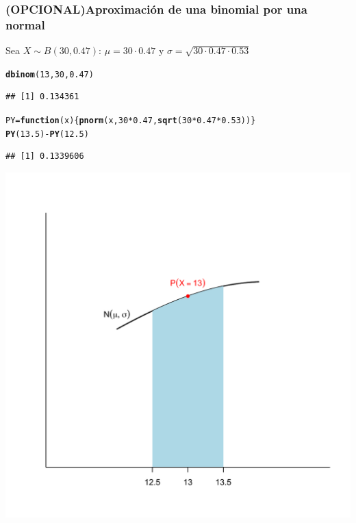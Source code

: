 \documentclass[handout]{beamer}\usepackage[]{graphicx}\usepackage[]{color}
\makeatletter
\newcommand{\hlnum}[1]{\textcolor[rgb]{0.686,0.059,0.569}{#1}}%
\newcommand{\hlopt}[1]{\textcolor[rgb]{0,0,0}{#1}}%
\newcommand{\hlstd}[1]{\textcolor[rgb]{0.345,0.345,0.345}{#1}}%
\newcommand{\hlkwa}[1]{\textcolor[rgb]{0.161,0.373,0.58}{\textbf{#1}}}%
\newcommand{\hlkwb}[1]{\textcolor[rgb]{0.69,0.353,0.396}{#1}}%
\newcommand{\hlkwc}[1]{\textcolor[rgb]{0.333,0.667,0.333}{#1}}%
\newcommand{\hlkwd}[1]{\textcolor[rgb]{0.737,0.353,0.396}{\textbf{#1}}}%
\newenvironment{kframe}{%
 \def\at@end@of@kframe{}%
 \ifinner\ifhmode%
  \def\at@end@of@kframe{\end{minipage}}%
  \begin{minipage}{\columnwidth}%
 \fi\fi%
 \def\FrameCommand##1{\hskip\@totalleftmargin \hskip-\fboxsep
 \colorbox{shadecolor}{##1}\hskip-\fboxsep
     \hskip-\linewidth \hskip-\@totalleftmargin \hskip\columnwidth}%
 \MakeFramed {\advance\hsize-\width
   \@totalleftmargin\z@ \linewidth\hsize
   \@setminipage}}%
 {\par\unskip\endMakeFramed%
 \at@end@of@kframe}
\newenvironment{knitrout}{}{} %
\theoremstyle{plain}
\theoremstyle{definition}
\makeatother
\begin{document}
\begin{frame}[fragile]
\frametitle{(OPCIONAL)Aproximación de una binomial por una normal}
\vspace*{-1ex}

Sea $X\sim B(30,0.47)$: $\mu\!=\!30\!\cdot\! 0.47$ y $\sigma\!=\!\sqrt{30\!\cdot\! 0.47\!\cdot\! 0.53}$
\begin{knitrout}
\color{fgcolor}\begin{kframe}
\begin{alltt}
\hlkwd{dbinom}\hlstd{(}\hlnum{13}\hlstd{,}\hlnum{30}\hlstd{,}\hlnum{0.47}\hlstd{)}
\end{alltt}
\begin{verbatim}
## [1] 0.134361
\end{verbatim}
\begin{alltt}
\hlstd{PY}\hlkwb{=}\hlkwa{function}\hlstd{(}\hlkwc{x}\hlstd{)\{}\hlkwd{pnorm}\hlstd{(x,}\hlnum{30}\hlopt{*}\hlnum{0.47}\hlstd{,}\hlkwd{sqrt}\hlstd{(}\hlnum{30}\hlopt{*}\hlnum{0.47}\hlopt{*}\hlnum{0.53}\hlstd{))\}}
\hlkwd{PY}\hlstd{(}\hlnum{13.5}\hlstd{)}\hlopt{-}\hlkwd{PY}\hlstd{(}\hlnum{12.5}\hlstd{)}
\end{alltt}
\begin{verbatim}
## [1] 0.1339606
\end{verbatim}
\end{kframe}
\end{knitrout}


\vspace*{-5ex}

\begin{center}
\includegraphics[width=0.4\linewidth]{binomvsnorm1}
\end{center}



\end{frame}
\end{document}
